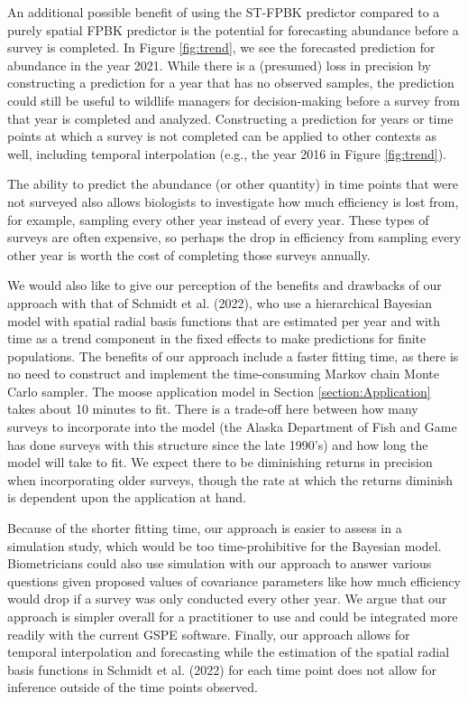 \documentclass[]{article}    %
\begin{document}
An additional possible benefit of using the ST-FPBK predictor compared
to a purely spatial FPBK predictor is the potential for forecasting
abundance before a survey is completed. In Figure \ref{fig:trend}, we
see the forecasted prediction for abundance in the year 2021. While
there is a (presumed) loss in precision by constructing a prediction for
a year that has no observed samples, the prediction could still be
useful to wildlife managers for decision-making before a survey from
that year is completed and analyzed. Constructing a prediction for years
or time points at which a survey is not completed can be applied to
other contexts as well, including temporal interpolation (e.g., the year
2016 in Figure \ref{fig:trend}).

The ability to predict the abundance (or other quantity) in time points
that were not surveyed also allows biologists to investigate how much
efficiency is lost from, for example, sampling every other year instead
of every year. These types of surveys are often expensive, so perhaps
the drop in efficiency from sampling every other year is worth the cost
of completing those surveys annually.

We would also like to give our perception of the benefits and drawbacks
of our approach with that of Schmidt et al. (2022), who use a
hierarchical Bayesian model with spatial radial basis functions that are
estimated per year and with time as a trend component in the fixed
effects to make predictions for finite populations. The benefits of our
approach include a faster fitting time, as there is no need to construct
and implement the time-consuming Markov chain Monte Carlo sampler. The
moose application model in Section \ref{section:Application} takes about
10 minutes to fit. There is a trade-off here between how many surveys to
incorporate into the model (the Alaska Department of Fish and Game has
done surveys with this structure since the late 1990's) and how long the
model will take to fit. We expect there to be diminishing returns in
precision when incorporating older surveys, though the rate at which the
returns diminish is dependent upon the application at hand.

Because of the shorter fitting time, our approach is easier to assess in
a simulation study, which would be too time-prohibitive for the Bayesian
model. Biometricians could also use simulation with our approach to
answer various questions given proposed values of covariance parameters
like how much efficiency would drop if a survey was only conducted every
other year. We argue that our approach is simpler overall for a
practitioner to use and could be integrated more readily with the
current GSPE software. Finally, our approach allows for temporal
interpolation and forecasting while the estimation of the spatial radial
basis functions in Schmidt et al. (2022) for each time point does not
allow for inference outside of the time points observed.
\end{document}

